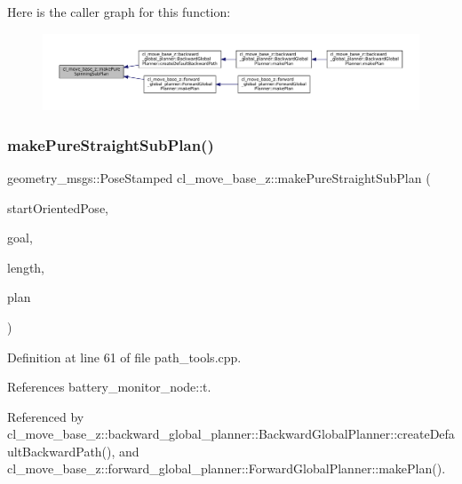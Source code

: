 Here is the caller graph for this function\+:
\nopagebreak
\begin{figure}[H]
\begin{center}
\leavevmode
\includegraphics[width=350pt]{namespacecl__move__base__z_ac774e138510eb7b5e0015be1f7709e19_icgraph}
\end{center}
\end{figure}
\mbox{\label{namespacecl__move__base__z_a84f0875e9e553c2795894cc9c21b2b3c}} 
\subsubsection{\texorpdfstring{make\+Pure\+Straight\+Sub\+Plan()}{makePureStraightSubPlan()}}
{\footnotesize\ttfamily geometry\+\_\+msgs\+::\+Pose\+Stamped cl\+\_\+move\+\_\+base\+\_\+z\+::make\+Pure\+Straight\+Sub\+Plan (\begin{DoxyParamCaption}\item[{const geometry\+\_\+msgs\+::\+Pose\+Stamped \&}]{start\+Oriented\+Pose,  }\item[{const geometry\+\_\+msgs\+::\+Point \&}]{goal,  }\item[{double}]{length,  }\item[{std\+::vector$<$ geometry\+\_\+msgs\+::\+Pose\+Stamped $>$ \&}]{plan }\end{DoxyParamCaption})}



Definition at line 61 of file path\+\_\+tools.\+cpp.



References battery\+\_\+monitor\+\_\+node\+::t.



Referenced by cl\+\_\+move\+\_\+base\+\_\+z\+::backward\+\_\+global\+\_\+planner\+::\+Backward\+Global\+Planner\+::create\+Default\+Backward\+Path(), and cl\+\_\+move\+\_\+base\+\_\+z\+::forward\+\_\+global\+\_\+planner\+::\+Forward\+Global\+Planner\+::make\+Plan().


